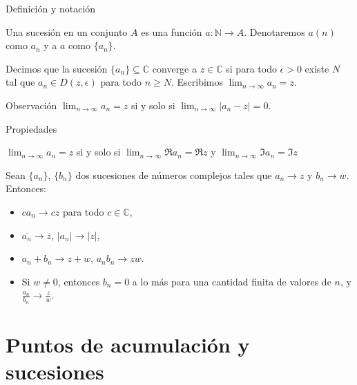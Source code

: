 \documentclass[spanish,presentation]{beamer}
\begin{document}
\begin{frame}[label=sec-2-1]{Definición y notación}
\begin{definition}[Sucesión]
Una \alert{sucesión} en un conjunto \(A\) es una función
\(a\colon\mathbb{N}\to A\). Denotaremos \(a(n)\) como \(a_{n}\) y
a \(a\) como \(\{a_{n}\}\).
\end{definition}

\begin{definition}[Convergencia]
Decimos que la sucesión \(\{a_{n}\}\subseteq \mathbb{C}\) \alert{converge}
a \(z\in\mathbb{C}\) si para todo \(\epsilon>0\) existe \(N\) tal
que \(a_{n}\in D(z,\epsilon)\) para todo \(n\geq N\). Escribimos
\(\lim_{n\to\infty}a_{n}=z\). 
\end{definition}

\begin{block}{Observación}
\(\lim_{n\to\infty}a_{n}=z\) si y solo si \(\lim_{n\to\infty}|a_{n}-z|=0\).
\end{block}
\end{frame}


\begin{frame}[label=sec-2-2]{Propiedades}
\begin{theorem}
\(\lim_{n\to\infty}a_{n}=z\) si y solo si \(\lim_{n\to\infty}\Re
    a_{n}=\Re z\) y \(\lim_{n\to\infty}\Im a_{n}=\Im z\)
\end{theorem}

\begin{theorem}
Sean \(\{a_{n}\}\), \(\{b_{n}\}\) dos sucesiones de números
complejos tales que \(a_{n}\to z\) y \(b_{n}\to w\). Entonces:

\begin{itemize}
\item \(ca_{n}\to cz\) para todo \(c\in \mathbb{C}\),
\item \(\overline{a_{n}}\to \overline{z}\), \(|a_{n}|\to |z|\),
\item \(a_{n}+b_{n}\to z+w\), \(a_{n}b_{n}\to zw\).
\item Si \(w\ne 0\), entonces \(b_{n}= 0\) a lo más para una cantidad
finita de valores de \(n\), y \(\frac{a_{n}}{b_{n}}\to
      \frac{z}{w}\).
\end{itemize}
\end{theorem}
\end{frame}

\section{Puntos de acumulación y sucesiones}
\label{sec-3}
\end{document}
